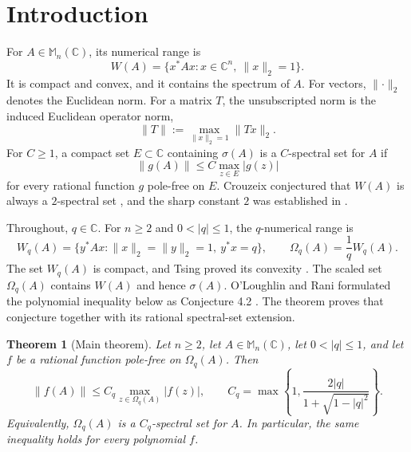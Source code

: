 \documentclass[preprints,article,submit,oneauthor]{Definitions/mdpi}
\newcounter{manuscriptresult}[section]
\theoremstyle{mdpi}
\newtheorem{theorem}[manuscriptresult]{Theorem}
\theoremstyle{definition}
\newcommand{\C}{\mathbb C}
\newcommand{\Mn}{\mathbb M_n(\C)}
\begin{document}
\section{Introduction}
\label{sec:introduction}

For $A\in\Mn$, its numerical range is
\[
 W(A)=\{x^*Ax:x\in\C^n,\ \lVert x\rVert_2=1\}.
\]
It is compact and convex, and it contains the spectrum of $A$.
For vectors, $\lVert\cdot\rVert_2$ denotes the Euclidean norm.  For a
matrix $T$, the unsubscripted norm is the induced Euclidean operator norm,
\[
 \lVert T\rVert:=
 \max_{\lVert x\rVert_2=1}\lVert Tx\rVert_2.
\]
For $C\geq1$, a compact set $E\subset\C$ containing $\sigma(A)$ is a
$C$-spectral set for $A$ if
\begin{equation}
 \lVert g(A)\rVert
 \leq C\max_{z\in E}\lvert g(z)\rvert
 \label{eq:spectral-set-definition}
\end{equation}
for every rational function $g$ pole-free on $E$.
Crouzeix conjectured that $W(A)$ is always a $2$-spectral set
\cite{Crouzeix2004}, and the sharp constant $2$ was established in
\cite{Jin2026}.

Throughout, $q\in\C$.  For $n\geq2$ and $0<\lvert q\rvert\leq1$, the
$q$-numerical range is
\begin{equation}
 W_q(A)=
 \{y^*Ax:\lVert x\rVert_2=\lVert y\rVert_2=1,\ y^*x=q\},
 \qquad
 \Omega_q(A)=\frac1qW_q(A).
 \label{eq:q-range-definition}
\end{equation}
The set $W_q(A)$ is compact, and Tsing proved its convexity
\cite{Tsing1984}.  The scaled set $\Omega_q(A)$ contains $W(A)$ and
hence $\sigma(A)$.  O'Loughlin and Rani formulated the polynomial
inequality below as Conjecture 4.2 \cite{OLoughlinRani2026}.  The
theorem proves that conjecture together with its rational spectral-set
extension.

\begin{theorem}[Main theorem]
\label{thm:main}
Let $n\geq2$, let $A\in\Mn$, let $0<\lvert q\rvert\leq1$, and let
$f$ be a rational function pole-free on $\Omega_q(A)$.  Then
\begin{equation}
 \lVert f(A)\rVert
 \leq
 C_q\max_{z\in\Omega_q(A)}\lvert f(z)\rvert,
 \qquad
 C_q=
 \max\left\{1,
 \frac{2\lvert q\rvert}
 {1+\sqrt{1-\lvert q\rvert^2}}\right\}.
 \label{eq:main-bound}
\end{equation}
Equivalently, $\Omega_q(A)$ is a $C_q$-spectral set for $A$.
In particular, the same inequality holds for every polynomial $f$.
\end{theorem}
\end{document}
